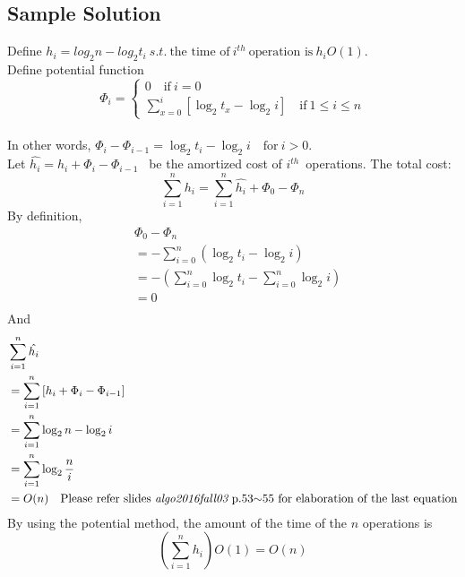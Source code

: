 \documentclass[a4paper]{article}
\begin{document}
\subsection{Sample Solution}
Define $h_i = log_{2}n-log_{2}t_i\ s.t.\ 
\text{the time of}\ i^{th}\ \text{operation is}\ h_{i}O(1)$.\\
Define potential function\\
$$\Phi_i =
\begin{cases}
0\quad \text{if}\ i=0\\
\sum\limits_{x=0}^{i} 
	[\log_{2}t_x - \log_{2}i]
	\quad \text{if}\ 1\leq i\leq n
\end{cases}
$$ \\
In other words, $\Phi_i-\Phi_{i-1}=\log_{2}t_i - \log_{2}i\quad \text{for}\ i>0$.\\
Let $\hat{h_i} = h_i +\Phi_i -\Phi_{i-1} $ \ be the amortized cost of $i^{th}$\ operations. The total cost:
$$\sum\limits_{i=1}^{n}h_i=\sum\limits_{i=1}^{n}\hat{h_i}+\Phi_0-\Phi_n$$
By definition,\\
\begin{align*}
&\Phi_0-\Phi_n\\
&=-\sum\limits_{i=0}^n (\log_2{t_i}-\log_2i) \\
&=-\left(\sum\limits_{i=0}^{n}\log_2t_i-\sum\limits_{i=0}^{n}\log_2i\right)\\
&=0\\
\end{align*}
And\\
\begin{align*}
&\sum\limits_{i=1}^{n}\hat{h_i}\\
&=\sum\limits_{i=1}^{n}\left[h_i+\Phi_i-\Phi_{i-1}\right]\\
&=\sum\limits_{i=1}^{n}\log_2n-\log_2i\\
&=\sum\limits_{i=1}^{n}\log_2\frac{n}{i}\\
&=O(n) \quad\text{Please refer slides {\em algo2016fall03} p.53$\sim$55 for elaboration of the last equation}
\end{align*}
By using the potential method, the amount of the time of the $n$ operations is\\
$$\left(\sum\limits_{i=1}^{n}h_i\right)O(1)=O(n)$$
\end{document}
